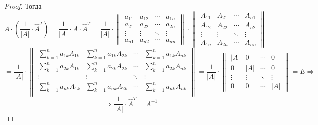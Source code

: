 \begin{proof}
Тогда
\begin{equation*}
A \cdot \left( \frac1{|A|} \cdot \hat A^T \right) =
\frac1{|A|} \cdot A \cdot \hat A^T =
\frac1{|A|} \cdot
\begin{Vmatrix}
a_{11} & a_{12} & \cdots & a_{1n} \\
a_{21} & a_{22} & \cdots & a_{2n} \\
\vdots & \vdots & \ddots & \vdots \\
a_{n1} & a_{n2} & \cdots & a_{nn}
\end{Vmatrix} \cdot
\begin{Vmatrix}
A_{11} & A_{21} & \cdots & A_{n1} \\
A_{12} & A_{22} & \cdots & A_{n2} \\
\vdots & \vdots & \ddots & \vdots \\
A_{1n} & A_{2n} & \cdots & A_{nn}
\end{Vmatrix} =
\end{equation*}
\begin{equation*}
= \frac1{|A|} \cdot
\begin{Vmatrix}
\sum\limits_{k=1}^n a_{1k} A_{1k} & \sum\limits_{k=1}^n a_{1k} A_{2k} & \cdots & \sum\limits_{k=1}^n a_{1k} A_{nk} \\
\sum\limits_{k=1}^n a_{2k} A_{1k} & \sum\limits_{k=1}^n a_{2k} A_{2k} & \cdots & \sum\limits_{k=1}^n a_{2k} A_{nk} \\
\vdots & \vdots & \ddots & \vdots \\
\sum\limits_{k=1}^n a_{nk} A_{1k} & \sum\limits_{k=1}^n a_{nk} A_{2k} & \cdots & \sum\limits_{k=1}^n a_{nk} A_{nk} \\
\end{Vmatrix} =
\frac1{|A|} \cdot
\begin{Vmatrix}
|A| & 0 & \cdots & 0 \\
0 & |A| & \cdots & 0 \\
\vdots & \vdots & \ddots & \vdots \\
0 & 0 & \cdots & |A|
\end{Vmatrix} = E \Rightarrow
\end{equation*}
\begin{equation*}
\Rightarrow \frac1{|A|} \cdot \hat A^T = A^{-1}
\end{equation*}
\end{proof}


